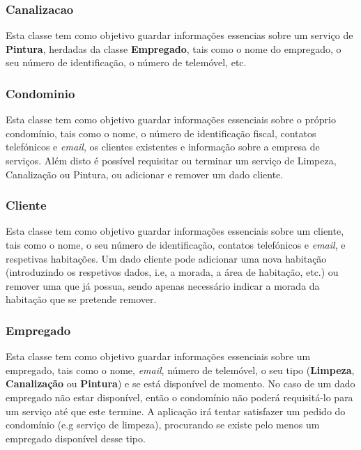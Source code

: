 \documentclass[a4paper]{article}
\begin{document}
\subsubsection{Canalizacao}

Esta classe tem como objetivo guardar informações essencias sobre um serviço de \textbf{Pintura}, herdadas da classe \textbf{Empregado}, tais como o nome do empregado, o seu número de identificação, o número de telemóvel, etc.

\subsubsection{Condominio}

Esta classe tem como objetivo guardar informações essenciais sobre o próprio condomínio, tais como o nome, o número de identificação fiscal, contatos telefónicos e \textit{email}, os clientes existentes e informação sobre a empresa de serviços. Além disto é possível requisitar ou terminar um serviço de Limpeza, Canalização ou Pintura, ou adicionar e remover um dado cliente.

\subsubsection{Cliente}

Esta classe tem como objetivo guardar informações essenciais sobre um cliente, tais como o nome, o seu número de identificação, contatos telefónicos e \textit{email}, e respetivas habitações. Um dado cliente pode adicionar uma nova habitação (introduzindo os respetivos dados, i.e, a morada, a área de habitação, etc.) ou remover uma que já possua, sendo apenas necessário indicar a morada da habitação que se pretende remover.

\subsubsection{Empregado}

Esta classe tem como objetivo guardar informações essenciais sobre um empregado, tais como o nome, \textit{email}, número de telemóvel, o seu tipo (\textbf{Limpeza}, \textbf{Canalização} ou \textbf{Pintura}) e se está disponível de momento. No caso de um dado empregado não estar disponível, então o condomínio não poderá requisitá-lo para um serviço até que este termine. A aplicação irá tentar satisfazer um pedido do condomínio (e.g serviço de limpeza), procurando se existe pelo menos um empregado disponível desse tipo.
\end{document}
